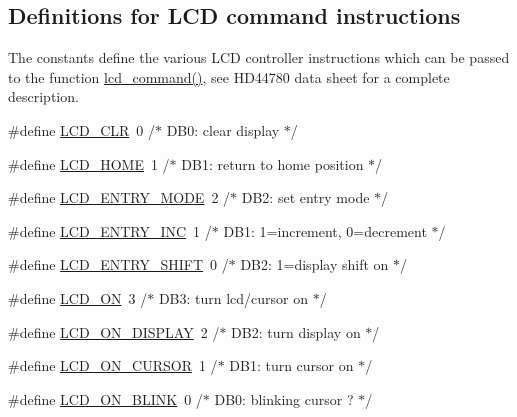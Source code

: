 \subsection*{Definitions for L\+CD command instructions}
\label{_amgrpe1b1604cb195ab970ebf8b6b8b3e322f}%
The constants define the various L\+CD controller instructions which can be passed to the function \hyperlink{group__pfleury__lcd_gaea9d14f02df06f948cb5a56776980826}{lcd\+\_\+command()}, see H\+D44780 data sheet for a complete description. \begin{DoxyCompactItemize}
\item 
\#define \hyperlink{group__pfleury__lcd_ga459688213267d13ccfbeb2c9004988cb}{L\+C\+D\+\_\+\+C\+LR}~0      /$\ast$ D\+B0\+: clear display                  $\ast$/
\item 
\#define \hyperlink{group__pfleury__lcd_gae0e309ccad89222eb3457f2da9f2bb8d}{L\+C\+D\+\_\+\+H\+O\+ME}~1      /$\ast$ D\+B1\+: return to home position        $\ast$/
\item 
\#define \hyperlink{group__pfleury__lcd_gae5d757ddb6d94de8c82191b60b40e442}{L\+C\+D\+\_\+\+E\+N\+T\+R\+Y\+\_\+\+M\+O\+DE}~2      /$\ast$ D\+B2\+: set entry mode                 $\ast$/
\item 
\#define \hyperlink{group__pfleury__lcd_gada766266a0be0d0040fbf86e23b58aa6}{L\+C\+D\+\_\+\+E\+N\+T\+R\+Y\+\_\+\+I\+NC}~1      /$\ast$   D\+B1\+: 1=increment, 0=decrement     $\ast$/
\item 
\#define \hyperlink{group__pfleury__lcd_ga14d0c7fda147e0dc8cdaa4a2629b3532}{L\+C\+D\+\_\+\+E\+N\+T\+R\+Y\+\_\+\+S\+H\+I\+FT}~0      /$\ast$   D\+B2\+: 1=display shift on           $\ast$/
\item 
\#define \hyperlink{group__pfleury__lcd_ga47a809dfec086fdeca93dedc4fb83b44}{L\+C\+D\+\_\+\+ON}~3      /$\ast$ D\+B3\+: turn lcd/cursor on             $\ast$/
\item 
\#define \hyperlink{group__pfleury__lcd_gae84f634b0a1661c4d5bbaafd9397732a}{L\+C\+D\+\_\+\+O\+N\+\_\+\+D\+I\+S\+P\+L\+AY}~2      /$\ast$   D\+B2\+: turn display on              $\ast$/
\item 
\#define \hyperlink{group__pfleury__lcd_ga47638b5ebbaec9600a0ebf9a55caf802}{L\+C\+D\+\_\+\+O\+N\+\_\+\+C\+U\+R\+S\+OR}~1      /$\ast$   D\+B1\+: turn cursor on               $\ast$/
\item 
\#define \hyperlink{group__pfleury__lcd_ga5d76592a978537acee615098ce4d80f5}{L\+C\+D\+\_\+\+O\+N\+\_\+\+B\+L\+I\+NK}~0      /$\ast$     D\+B0\+: blinking cursor ?          $\ast$/
\item 

\end{DoxyCompactItemize}
